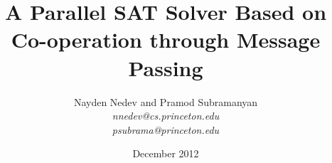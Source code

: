 \documentclass[10pt]{article}
\begin{document}
\title{A Parallel SAT Solver Based on \\ Co-operation through Message Passing}
\author{Nayden Nedev and Pramod Subramanyan \\
        \textit{nnedev@cs.princeton.edu} \\ \textit{psubrama@princeton.edu}}
\date{December 2012}

\maketitle
\end{document}
